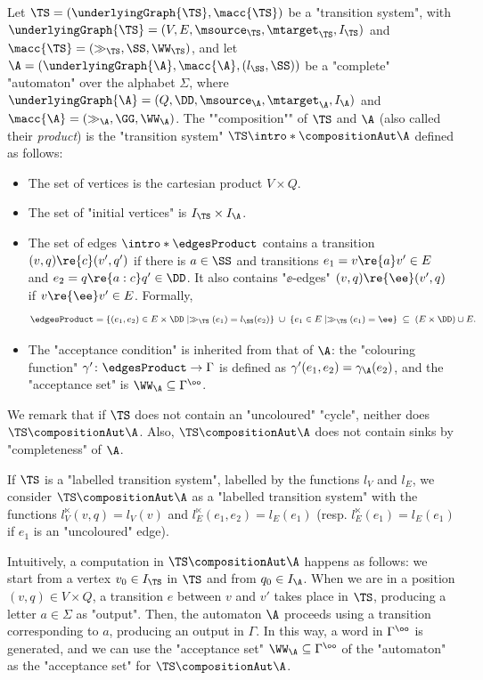 \documentclass{theoretics}
\begin{document}
Let $\TS =(\underlyingGraph{\TS}, \macc{\TS})$ be a "transition system", with $\underlyingGraph{\TS} = (V, E, \msource_\TS, \mtarget_\TS, I_{\TS})$ and $\macc{\TS} = (\gg_{\TS}, \SS, \WW_{\TS})$, %
and let $\A=\left(\underlyingGraph{\A}, \macc{\A}, (l_\SS, \SS)\right)$ be a "complete" "automaton" over the alphabet $\Sigma$, where $\underlyingGraph{\A} = (Q,  \DD, \msource_\A, \mtarget_\A, I_{\A})$ and $\macc{\A} = (\gg_{\A}, \GG, \WW_{\A})$. 
\AP The ""composition"" of $\TS$ and $\A$ (also called their \emph{product}) is the "transition system" $\TS \intro*\compositionAut \A$ defined as follows:
\begin{itemize}
	\item The set of vertices is the cartesian product $V\times Q$.
	\item The set of "initial vertices" is $I_{\TS} \times I_{\A}$.
	\item The set of edges $\intro*\edgesProduct$ contains a transition $(v,q)\re{c} (v', q')$ if there is $a\in \SS$ and transitions $e_1 = v\re{a} v'\in E$  and $e_2 = q\re{a:c} q'\in \DD$. It also contains "$\ee$-edges" $(v,q)\re{\ee} (v', q)$ if $v\re{\ee}v'\in E$. Formally, 
	\[ \edgesProduct = \{(e_1,e_2) \in E\times \DD \mid \gg_{\TS}(e_1) = l_\SS(e_2)\} \; \cup \; \{e_1 \in E \mid \gg_{\TS}(e_1) = \ee \} \; \subseteq \; (E \times \DD) \cup E. \]
	\item The "acceptance condition" is inherited from that of $\A$: the "colouring function" $\gamma'\colon \edgesProduct \to \Gamma$ is defined as $\gamma'(e_1,e_2)= \gamma_{\A}(e_2)$, and the "acceptance set" is $\WW_\A \subseteq \Gamma^\oo$.
\end{itemize}

We remark that if $\TS$ does not contain an "uncoloured" "cycle", neither does $\TS \compositionAut \A$. Also, $\TS \compositionAut \A$ does not contain sinks by "completeness" of $\A$.

If $\TS$ is a "labelled transition system", labelled by the functions $l_V$ and $l_E$, we consider $\TS \compositionAut \A$ as a "labelled transition system" with the functions $l_V^\ltimes(v,q) = l_V(v)$ and $l^\ltimes_E(e_1, e_2) = l_E(e_1)$ (resp. $l^\ltimes_E(e_1) = l_E(e_1)$ if $e_1$ is an "uncoloured" edge). 


Intuitively, a computation in $\TS \compositionAut \A$ happens as follows: we start from a vertex $v_0\in I_{\TS}$ in $\TS$ and from $q_0 \in I_{\A}$. When we are in a position $(v, q)\in V \times Q$, a transition $e$ between $v$ and $v'$ takes place in $\TS$, producing a letter $a\in \Sigma$ as "output". Then, the automaton $\A$ proceeds using a transition corresponding to $a$, producing an output in $\Gamma$. In this way, a word in $\Gamma^\oo$ is generated, and we can use the "acceptance set" $\WW_\A \subseteq \Gamma^\oo$ of the "automaton" as the "acceptance set" for $\TS \compositionAut \A$.
\end{document}
